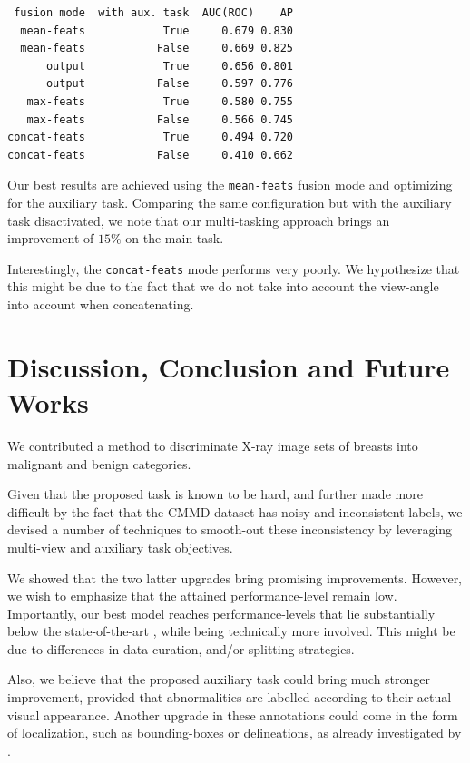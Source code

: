 \documentclass[11pt]{article}
\begin{document}
\begin{verbatim}
 fusion mode  with aux. task  AUC(ROC)    AP
  mean-feats            True     0.679 0.830
  mean-feats           False     0.669 0.825
      output            True     0.656 0.801
      output           False     0.597 0.776
   max-feats            True     0.580 0.755
   max-feats           False     0.566 0.745
concat-feats            True     0.494 0.720
concat-feats           False     0.410 0.662
\end{verbatim}


Our best results are achieved using the \texttt{mean-feats} fusion mode and
optimizing for the auxiliary task.
Comparing the same configuration but with the auxiliary task disactivated,
we note that our multi-tasking approach brings an improvement of \(15\%\) on the main task.

Interestingly, the \texttt{concat-feats} mode performs very poorly.
We hypothesize that this might be due to the fact
that we do not take into account the view-angle into account when
concatenating.

\section{Discussion, Conclusion and Future Works}
\label{sec:orgd6d8ed2}

We contributed a method to discriminate X-ray image sets of breasts into malignant and benign
categories.

Given that the proposed task is known to be hard, and further made more difficult by
the fact that the CMMD dataset has noisy and inconsistent labels,
we devised a number of techniques to smooth-out these inconsistency by
leveraging multi-view and auxiliary task objectives.

We showed that the two latter upgrades bring promising improvements.
However, we wish to emphasize that the attained performance-level remain low.
Importantly, our best model reaches performance-levels that lie substantially
below the state-of-the-art \autocite{tardy22}, while being technically more involved.
This might be due to differences in data curation, and/or splitting strategies.

Also, we believe that the proposed auxiliary task could bring much stronger
improvement, provided that abnormalities are labelled according to their actual
visual appearance. Another upgrade in these annotations could come in the form
of localization, such as bounding-boxes or delineations, as already investigated by \autocite{tang19}.



\printbibliography
\end{document}
